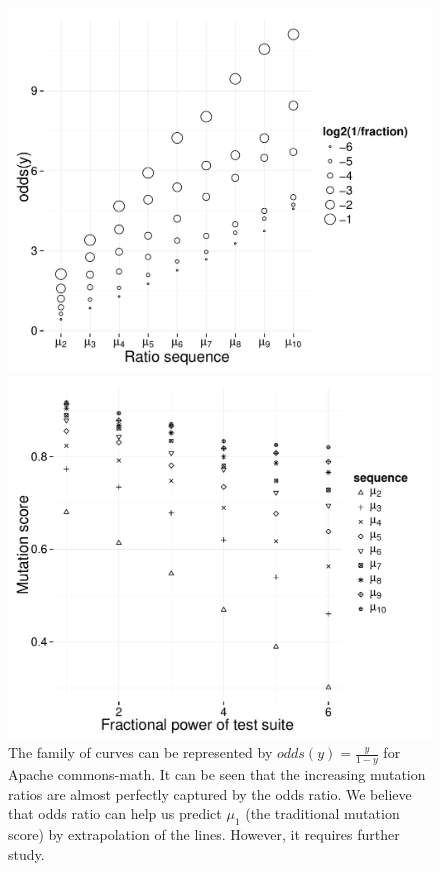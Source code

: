 \documentclass[conference]{IEEEtran}
\begin{document}
\begin{figure}
\begin{Schunk}


{\centering \includegraphics[width=.99\linewidth]{twocolumn-unnamed-chunk-26} 

}

\end{Schunk}

\caption{The family of curves can be represented by $odds(y) = \frac{y}{1-y}$ for Apache commons-math. It can be
seen that the increasing mutation ratios are almost perfectly captured by the odds ratio. We believe that
odds ratio can help us predict $\mu_1$ (the traditional mutation score) by
extrapolation of the lines. However, it requires further study.}
\label{fig:lines}
\begin{Schunk}


{\centering \includegraphics[width=.99\linewidth]{twocolumn-unnamed-chunk-27} 

}
\end{Schunk}
\end{figure}
\end{document}
